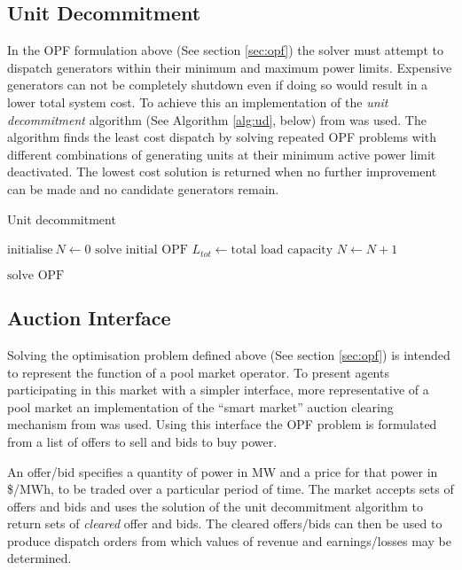 \subsection{Unit Decommitment}
In the OPF formulation above (See section \ref{sec:opf}) the solver must
attempt to dispatch generators within their minimum and maximum power limits.
Expensive generators can not be completely shutdown even if doing so would
result in a lower total system cost.  To achieve this an implementation of the
\textit{unit decommitment} algorithm (See Algorithm \ref{alg:ud}, below) from
\matpower was used\cite[p. 20]{pserc:mp_manual}.  The algorithm finds the least
cost dispatch by solving repeated OPF problems with different combinations of
generating units at their minimum active power limit deactivated.  The lowest
cost solution is returned when no further improvement can be made and no
candidate generators remain.
\begin{algorithm}[H]
\caption{Unit decommitment}
\label{alg:ud}
\begin{algorithmic}[1]
\STATE $\text{initialise}~N \leftarrow 0$
\STATE $\text{solve initial OPF}$
\STATE $L_{tot} \leftarrow \text{total load capacity}$
	\STATE $N \leftarrow N + 1$
\ENDWHILE

\REPEAT
		\STATE $\text{solve OPF}$
	\ENDFOR
{}
\end{algorithmic}
\end{algorithm}

\subsection{Auction Interface}
Solving the optimisation problem defined above (See section \ref{sec:opf}) is
intended to represent the function of a pool market operator.  To present
agents participating in this market with a simpler interface, more
representative of a pool market an implementation of the ``smart market''
auction clearing mechanism from \matpower was used\cite[p. 31]{pserc:mp_manual}.
Using this interface the OPF problem is formulated from a list of offers to
sell and bids to buy power.

An offer/bid specifies a quantity of power in MW and a price for that power in
\$/MWh, to be traded over a particular period of time.  The market
accepts sets of offers and bids and uses the solution of the unit decommitment
algorithm to return sets of \textit{cleared} offer and bids.  The cleared
offers/bids can then be used to produce dispatch orders from which values of
revenue and earnings/losses may be determined.

